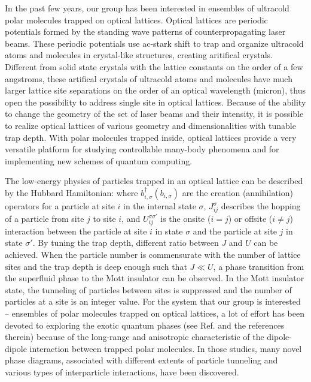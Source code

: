 In the past few years, our group has been interested in ensembles of ultracold polar molecules trapped on optical lattices.  Optical lattices are
 periodic potentials formed by the standing wave patterns of counterpropagating laser 
 beams\cite{Jessen1996, phillips1998}. These periodic potentials use ac-stark shift to trap and organize ultracold atoms and molecules in 
 crystal-like structures, creating aritifical crystals. Different from solid state crystals with the lattice constants on the order of a few angstroms, these artifical crystals of ultracold atoms and molecules have much larger lattice site separations
 on the order of an optical wavelength (micron), thus open the possibility to address single site in optical lattices\cite{atom-mott1, atom-mott2}. Because of the ability to change the geometry of the set of laser beams and their intensity, it is possible to realize optical lattices of various geometry and dimensionalities with tunable trap depth\cite{Jessen1996,
  phillips1998}. With polar molecules trapped inside, optical lattices provide a very versatile platform for studying controllable many-body 
  phenomena\cite{Baranov2012} and for implementing new schemes of quantum computing\cite{demille, yelin2006, ortner2011}. 
  
The low-energy physics of particles trapped in an optical lattice can be described by the Hubbard Hamiltonian:
where $b^{\dagger}_{i, \sigma} (b_{i, \sigma})$ are the creation (annihilation) operators for a particle at site $i$ in the
internal state $\sigma$, $J_{ij}^{\sigma}$ describes the hopping of a particle from site $j$ to site $i$, and $U_{i j}^{\sigma \sigma'}$ is the onsite ($i=j$) or offsite ($i\neq j$) interaction between the particle at site $i$ in state $\sigma$ and the particle at site $j$ in state $\sigma'$. By tuning the trap depth, different ratio between $J$ and $U$ can
be achieved. When  the particle number is commensurate with the 
number of lattice sites and the trap depth is deep enough such that $J \ll U$, a phase transition from the superfluid phase to the Mott insulator can be 
observed\cite{Greiner2002, spielman2007, haller2010}. In the Mott insulator state, the tunneling of particles between sites
is suppressed and the number of particles at a site is an integer value. For the system that our group is interested -- ensembles of 
polar molecules trapped on optical lattices, a lot of effort has been devoted to exploring the exotic quantum phases (see Ref.\cite{Baranov2012} and the references therein) because of the long-range and anisotropic characteristic of the 
dipole-dipole interaction between trapped polar molecules.  
In those studies, many novel phase diagrams, associated with different extents of particle tunneling and various types of 
interparticle interactions, have been discovered.


